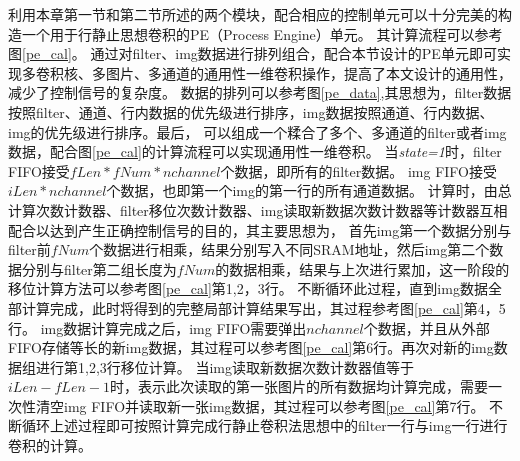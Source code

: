 利用本章第一节和第二节所述的两个模块，配合相应的控制单元可以十分完美的构造一个用于行静止思想卷积的PE（Process Engine）单元。
其计算流程可以参考图\ref{pe_cal}。
通过对filter、img数据进行排列组合，配合本节设计的PE单元即可实现多卷积核、多图片、多通道的通用性一维卷积操作，提高了本文设计的通用性，减少了控制信号的复杂度。
数据的排列可以参考图\ref{pe_data},其思想为，filter数据按照filter、通道、行内数据的优先级进行排序，img数据按照通道、行内数据、img的优先级进行排序。最后，
可以组成一个糅合了多个、多通道的filter或者img数据，配合图\ref{pe_cal}的计算流程可以实现通用性一维卷积。
当\emph{state=1}时，filter FIFO接受$fLen*fNum*nchannel$个数据，即所有的filter数据。
img FIFO接受$iLen*nchannel$个数据，也即第一个img的第一行的所有通道数据。
计算时，由总计算次数计数器、filter移位次数计数器、img读取新数据次数计数器等计数器互相配合以达到产生正确控制信号的目的，其主要思想为，
首先img第一个数据分别与filter前$fNum$个数据进行相乘，结果分别写入不同SRAM地址，然后img第二个数据分别与filter第二组长度为$fNum$的数据相乘，结果与上次进行累加，这一阶段的移位计算方法可以参考图\ref{pe_cal}第1,2，3行。
不断循环此过程，直到img数据全部计算完成，此时将得到的完整局部计算结果写出，其过程参考图\ref{pe_cal}第4，5行。
img数据计算完成之后，img FIFO需要弹出$nchannel$个数据，并且从外部FIFO存储等长的新img数据，其过程可以参考图\ref{pe_cal}第6行。再次对新的img数据组进行第1,2,3行移位计算。
当img读取新数据次数计数器值等于$iLen - fLen - 1$时，表示此次读取的第一张图片的所有数据均计算完成，需要一次性清空img FIFO并读取新一张img数据，其过程可以参考图\ref{pe_cal}第7行。
不断循环上述过程即可按照计算完成行静止卷积法思想中的filter一行与img一行进行卷积的计算。



